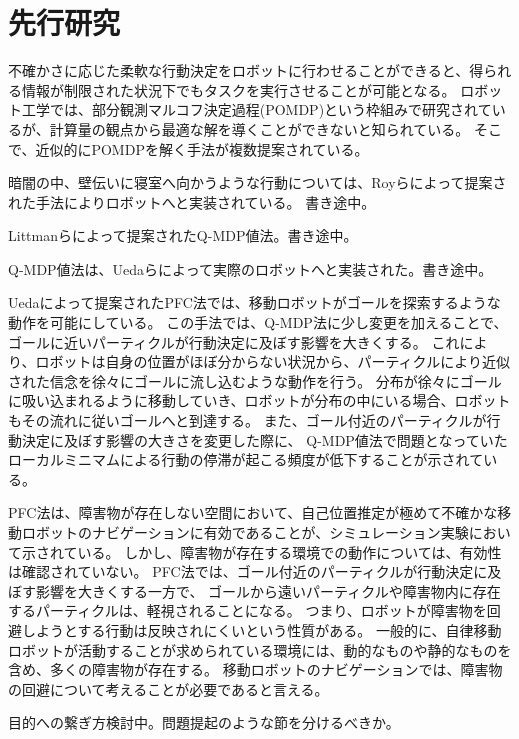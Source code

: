 \section{先行研究}

不確かさに応じた柔軟な行動決定をロボットに行わせることができると、得られる情報が制限された状況下でもタスクを実行させることが可能となる。
ロボット工学では、部分観測マルコフ決定過程(POMDP)という枠組みで研究されているが、計算量の観点から最適な解を導くことができないと知られている\cite{kaelbling1998}。
そこで、近似的にPOMDPを解く手法が複数提案されている。

暗闇の中、壁伝いに寝室へ向かうような行動については、Royらによって提案された手法によりロボットへと実装されている\cite{roy1999b}。
書き途中。

Littmanらによって提案されたQ-MDP値法\cite{littman1995}。書き途中。

Q-MDP値法は、Uedaらによって実際のロボットへと実装された\cite{ueda2003iros}。書き途中。

Uedaによって提案されたPFC法では、移動ロボットがゴールを探索するような動作を可能にしている\cite{ueda2015}。
この手法では、Q-MDP法に少し変更を加えることで、ゴールに近いパーティクルが行動決定に及ぼす影響を大きくする。
これにより、ロボットは自身の位置がほぼ分からない状況から、パーティクルにより近似された信念を徐々にゴールに流し込むような動作を行う。
分布が徐々にゴールに吸い込まれるように移動していき、ロボットが分布の中にいる場合、ロボットもその流れに従いゴールへと到達する。
また、ゴール付近のパーティクルが行動決定に及ぼす影響の大きさを変更した際に、
Q-MDP値法で問題となっていたローカルミニマムによる行動の停滞が起こる頻度が低下することが示されている\cite{ueda2018searching}。

PFC法は、障害物が存在しない空間において、自己位置推定が極めて不確かな移動ロボットのナビゲーションに有効であることが、シミュレーション実験において示されている。
しかし、障害物が存在する環境での動作については、有効性は確認されていない。
PFC法では、ゴール付近のパーティクルが行動決定に及ぼす影響を大きくする一方で、
ゴールから遠いパーティクルや障害物内に存在するパーティクルは、軽視されることになる。
つまり、ロボットが障害物を回避しようとする行動は反映されにくいという性質がある。
一般的に、自律移動ロボットが活動することが求められている環境には、動的なものや静的なものを含め、多くの障害物が存在する。
移動ロボットのナビゲーションでは、障害物の回避について考えることが必要であると言える。

目的への繋ぎ方検討中。問題提起のような節を分けるべきか。

